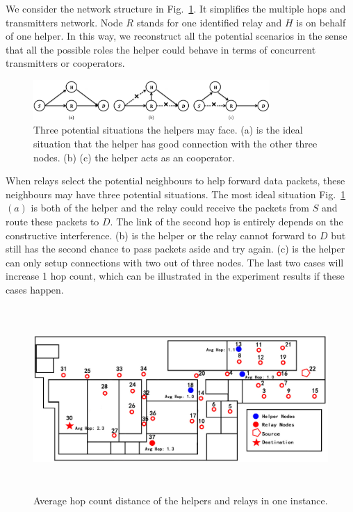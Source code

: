 \documentclass[conference]{IEEEtran}
\begin{document}
We consider the network structure in Fig.~\ref{fig:theoreticalanalysis}. It simplifies the multiple hops and transmitters network. Node $R$ stands for one identified relay and $H$ is on behalf of one helper. In this way, we reconstruct all the potential scenarios in the sense that all the possible roles the helper could behave in terms of concurrent transmitters or cooperators. 

\begin{figure}[!t]
\centering
\includegraphics[width=9cm]{theoreticalanalysis_cut.png}
\caption{Three potential situations the helpers may face. (a) is the ideal situation that the helper has good connection with the other three nodes. (b) (c) the helper acts as an cooperator.}
\label{fig:theoreticalanalysis}
\end{figure}

When relays select the potential neighbours to help forward data packets, these neighbours may have three potential situations. The most ideal situation Fig.~\ref{fig:theoreticalanalysis}$(a)$ is both of the helper and the relay could receive the packets from $S$ and route these packets to $D$. The link of the second hop is entirely depends on the constructive interference. (b) is the helper or the relay cannot forward to $D$ but still has the second chance to pass packets aside and try again. (c) is the helper can only setup connections with two out of three nodes. The last two cases will increase 1 hop count, which can be illustrated in the experiment results if these cases happen. 

\begin{figure}[!t]
\centering
\includegraphics[height=7cm]{withLinkQuality3.jpg}
\caption{Average hop count distance of the helpers and relays in one instance.}
\label{fig:hopcountexample}
\end{figure}
\end{document}
